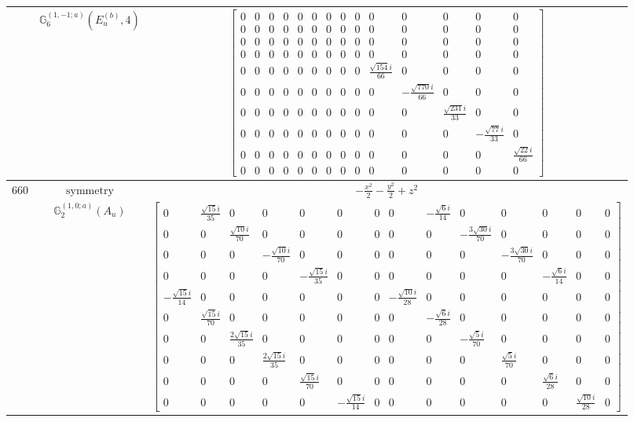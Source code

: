 \documentclass[fleqn,8pt,landscape]{jsarticle}
\begin{document}
\begin{longtable}{ccc}
$  $ & $ \mathbb{G}_{6}^{(1,-1;a)}(E_{u}^{(b)},4) $ & $ \begin{bmatrix} 0 & 0 & 0 & 0 & 0 & 0 & 0 & 0 & 0 & 0 & 0 & 0 & 0 & 0 \\ 0 & 0 & 0 & 0 & 0 & 0 & 0 & 0 & 0 & 0 & 0 & 0 & 0 & 0 \\ 0 & 0 & 0 & 0 & 0 & 0 & 0 & 0 & 0 & 0 & 0 & 0 & 0 & 0 \\ 0 & 0 & 0 & 0 & 0 & 0 & 0 & 0 & 0 & 0 & 0 & 0 & 0 & 0 \\ 0 & 0 & 0 & 0 & 0 & 0 & 0 & 0 & 0 & \frac{\sqrt{154} i}{66} & 0 & 0 & 0 & 0 \\ 0 & 0 & 0 & 0 & 0 & 0 & 0 & 0 & 0 & 0 & - \frac{\sqrt{770} i}{66} & 0 & 0 & 0 \\ 0 & 0 & 0 & 0 & 0 & 0 & 0 & 0 & 0 & 0 & 0 & \frac{\sqrt{231} i}{33} & 0 & 0 \\ 0 & 0 & 0 & 0 & 0 & 0 & 0 & 0 & 0 & 0 & 0 & 0 & - \frac{\sqrt{77} i}{33} & 0 \\ 0 & 0 & 0 & 0 & 0 & 0 & 0 & 0 & 0 & 0 & 0 & 0 & 0 & \frac{\sqrt{22} i}{66} \\ 0 & 0 & 0 & 0 & 0 & 0 & 0 & 0 & 0 & 0 & 0 & 0 & 0 & 0 \end{bmatrix} $ \\ \hline
$ 660 $ & $ \text{symmetry} $ & $ - \frac{x^{2}}{2} - \frac{y^{2}}{2} + z^{2} $ \\
$  $ & $ \mathbb{G}_{2}^{(1,0;a)}(A_{u}) $ & $ \begin{bmatrix} 0 & \frac{\sqrt{15} i}{35} & 0 & 0 & 0 & 0 & 0 & 0 & - \frac{\sqrt{6} i}{14} & 0 & 0 & 0 & 0 & 0 \\ 0 & 0 & \frac{\sqrt{10} i}{70} & 0 & 0 & 0 & 0 & 0 & 0 & - \frac{3 \sqrt{30} i}{70} & 0 & 0 & 0 & 0 \\ 0 & 0 & 0 & - \frac{\sqrt{10} i}{70} & 0 & 0 & 0 & 0 & 0 & 0 & - \frac{3 \sqrt{30} i}{70} & 0 & 0 & 0 \\ 0 & 0 & 0 & 0 & - \frac{\sqrt{15} i}{35} & 0 & 0 & 0 & 0 & 0 & 0 & - \frac{\sqrt{6} i}{14} & 0 & 0 \\ - \frac{\sqrt{15} i}{14} & 0 & 0 & 0 & 0 & 0 & 0 & - \frac{\sqrt{10} i}{28} & 0 & 0 & 0 & 0 & 0 & 0 \\ 0 & \frac{\sqrt{15} i}{70} & 0 & 0 & 0 & 0 & 0 & 0 & - \frac{\sqrt{6} i}{28} & 0 & 0 & 0 & 0 & 0 \\ 0 & 0 & \frac{2 \sqrt{15} i}{35} & 0 & 0 & 0 & 0 & 0 & 0 & - \frac{\sqrt{5} i}{70} & 0 & 0 & 0 & 0 \\ 0 & 0 & 0 & \frac{2 \sqrt{15} i}{35} & 0 & 0 & 0 & 0 & 0 & 0 & \frac{\sqrt{5} i}{70} & 0 & 0 & 0 \\ 0 & 0 & 0 & 0 & \frac{\sqrt{15} i}{70} & 0 & 0 & 0 & 0 & 0 & 0 & \frac{\sqrt{6} i}{28} & 0 & 0 \\ 0 & 0 & 0 & 0 & 0 & - \frac{\sqrt{15} i}{14} & 0 & 0 & 0 & 0 & 0 & 0 & \frac{\sqrt{10} i}{28} & 0 \end{bmatrix} $ \\ \hline

\end{longtable}
\end{document}
